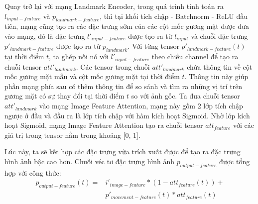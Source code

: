 Quay trở lại với mạng Landmark Encoder, trong quá trình tính toán ra $l_{input-feature}$ và $p_{landmark-feature}$, thì tại khối tích chập - Batchnorm - ReLU đầu tiên, mạng cũng tạo ra các đặc trưng sớm của các cột mốc gương mặt được đưa vào mạng, đó là đặc trưng $l'_{input-feature}$ được tạo ra từ $l_{input}$ và chuỗi đặc trưng $p'_{landmark-feature}$ được tạo ra từ $p_{landmark}$. Với từng tensor $p'_{landmark-feature}(t)$ tại thời điểm $t$, ta ghép nối nó với $l'_{input-feature}$ theo chiều channel để tạo ra chuỗi tensor $att'_{landmark}$. Các tensor trong chuỗi $att'_{landmark}$ chứa thông tin về cột mốc gương mặt mẫu và cột mốc gương mặt tại thời điểm $t$. Thông tin này giúp phần mạng phía sau có thêm thông tin để so sánh và tìm ra những vị trí trên gương mặt có sự thay đổi tại thời điểm $t$ so với ảnh gốc. Ta đưa chuỗi tensor $att'_{landmark}$ vào mạng Image Feature Attention, mạng này gồm 2 lớp tích chập ngược ở đầu và đầu ra là lớp tích chập với hàm kích hoạt Sigmoid. Nhờ lớp kích hoạt Sigmoid, mạng Image Feature Attention tạo ra chuỗi tensor $att_{feature}$ với các giá trị trong tensor nằm trong khoảng [0, 1]. 

Lúc này, ta sẽ kết hợp các đặc trưng vừa trích xuất được để tạo ra đặc trưng hình ảnh bậc cao hơn. Chuỗi véc tơ đặc trưng hình ảnh $p_{output-feature}$ được tổng hợp với công thức:
\begin{equation}
    \begin{split}
    p_{output-feature}(t) = &i'_{image-feature}*(1-att_{feature}(t))+\\
    &p'_{movement-feature}(t)*att_{feature}(t)
    \end{split}
\end{equation}

